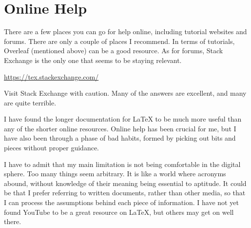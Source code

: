 \documentclass[11pt, oneside]{memoir}
\begin{document}
\chapter{Online Help}

There are a few places you can go for help online, including tutorial websites and forums. There are only a couple of places I recommend. In terms of tutorials, Overleaf (mentioned above) can be a good resource. As for forums, Stack Exchange is the only one that seems to be staying relevant.

\url{https://tex.stackexchange.com/}

Visit Stack Exchange with caution. Many of the answers are excellent, and many are quite terrible.

I have found the longer documentation for LaTeX to be much more useful than any of the shorter online resources. Online help has been crucial for me, but I have also been through a phase of bad habits, formed by picking out bits and pieces without proper guidance.

I have to admit that my main limitation is not being comfortable in the digital sphere. Too many things seem arbitrary. It is like a world where acronyms abound, without knowledge of their meaning being essential to aptitude. It could be that I prefer referring to written documents, rather than other media, so that I can process the assumptions behind each piece of information. I have not yet found YouTube to be a great resource on LaTeX, but others may get on well there.
\end{document}
